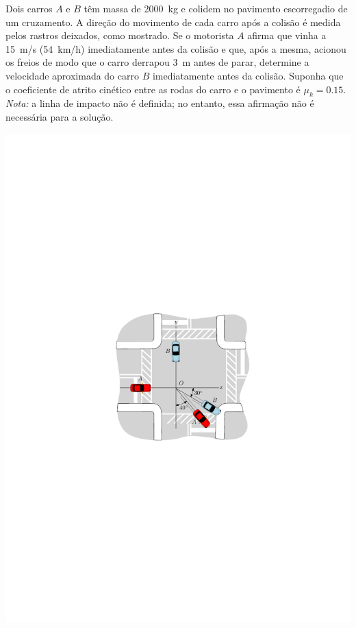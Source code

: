 \item Dois carros $A$ e $B$ têm massa de \SI{2000}{\kilogram} e colidem no pavimento escorregadio de um cruzamento. A direção do movimento de cada carro após a colisão é medida pelos rastros deixados, como mostrado. Se o motorista $A$ afirma que vinha a \SI{15}{\meter/\second} (\SI{54}{\kilo\meter/\hour}) imediatamente antes da colisão e que, após a mesma, acionou os freios de modo que o carro derrapou \SI{3}{\meter} antes de parar, determine a velocidade aproximada do carro $B$ imediatamente antes da colisão. Suponha que o coeficiente de atrito cinético entre as rodas do carro e o pavimento é $\mu_{k}=0.15$. \textit{Nota:} a linha de impacto não é definida; no entanto, essa afirmação não é necessária para a solução.

\begin{flushright}
	\includegraphics[scale=1.2]{images/draw_14}
\end{flushright}